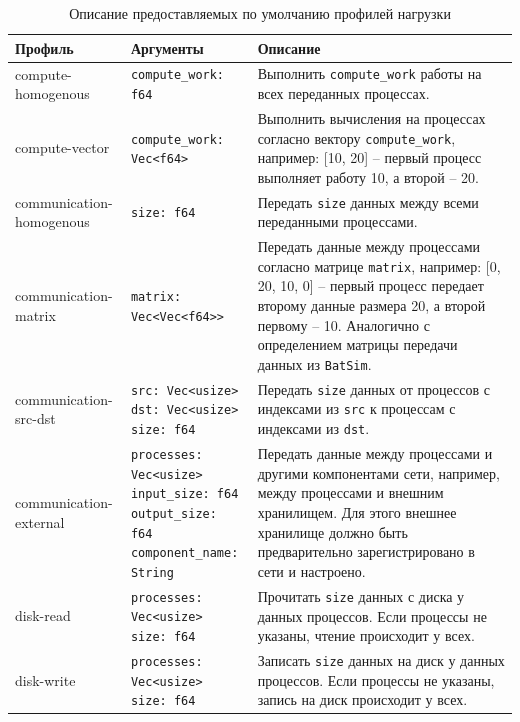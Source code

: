 \begin{table}[h!]
    \centering
    \begin{tabular}{|l|l|p{7cm}|}
        \hline
        \textbf{Профиль} & \textbf{Аргументы} & \textbf{Описание} \\ 
        \hline
        compute-homogenous & \texttt{compute\_work: f64} & Выполнить \texttt{compute\_work} работы на всех переданных процессах.\\
        \hline
        compute-vector &  \texttt{compute\_work: Vec<f64>} & Выполнить вычисления на процессах согласно вектору \texttt{compute\_work}, например: 
        [10, 20] -- первый процесс выполняет работу 10, а второй -- 20. \\
        \hline
        \makecell{
        communication-\\homogenous} & \texttt{size: f64} & Передать \texttt{size} данных между всеми переданными процессами. \\
        \hline 
        communication-matrix &  \texttt{matrix: Vec<Vec<f64>>}  & Передать данные между процессами согласно матрице \texttt{matrix}, например: 
        [0, 20,
        10, 0] -- первый процесс передает второму данные размера 20, а второй первому -- 10. Аналогично с определением матрицы передачи данных из \texttt{BatSim}\cite{batsim-profile-types-overview}. \\
        \hline
        communication-src-dst & \makecell[tl]{
              \texttt{src: Vec<usize>} \\ \texttt{dst: Vec<usize>} \\ \texttt{size: f64} }
         & Передать \texttt{size} данных от процессов с индексами из \texttt{src} к процессам с индексами из \texttt{dst}. \\
        \hline
        \makecell{communication-\\external} & \makecell[tl]{
             \texttt{processes: Vec<usize>}\\ \texttt{input\_size: f64}\\ \texttt{output\_size: f64}\\ \texttt{component\_name: String}} & Передать данные между процессами и другими компонентами сети, например, между процессами и внешним хранилищем. Для этого внешнее хранилище должно быть предварительно зарегистрировано в сети и настроено. \\
            \hline
        disk-read & \makecell[tl]{ \texttt{processes: Vec<usize>}\\ \texttt{size: f64}} & Прочитать \texttt{size} данных с диска у данных процессов. Если процессы не указаны, чтение происходит у всех. \\
        \hline
        disk-write & \makecell[tl]{\texttt{processes: Vec<usize>}\\\texttt{size: f64}}  & Записать \texttt{size} данных на диск у данных процессов. Если процессы не указаны, запись на диск происходит у всех. \\
        \hline
    \end{tabular}
    \caption{Описание предоставляемых по умолчанию профилей нагрузки}
    \label{tab:default-profiles}
\end{table}

